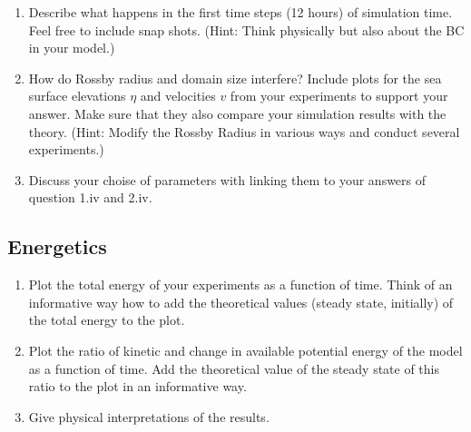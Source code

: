 \begin{question}
\begin{enumerate}
\item Describe what happens in the first time steps (12 hours) of simulation time. Feel free to include snap shots. (Hint: Think physically but also about the BC in your model.)

\item How do Rossby radius and domain size interfere? Include plots for the sea surface elevations $\eta$ and velocities $v$ from your experiments to support your answer. Make sure that they also compare your simulation results with the theory. (Hint: Modify the Rossby Radius in various ways and conduct several experiments.)

\item Discuss your choise of parameters with linking them to your answers of question 1.iv and 2.iv.

\end{enumerate}


\subsection*{Energetics}

\begin{enumerate}

\item Plot the total energy of your experiments as a function of time. Think of an informative way how to add the theoretical values (steady state, initially) of the total energy to the plot.

\item Plot the ratio of kinetic and change in available potential energy of the model as a function of time. Add the theoretical value of the steady state of this ratio to the plot in an informative way.

\item Give physical interpretations of the results.

\end{enumerate}
\end{question}